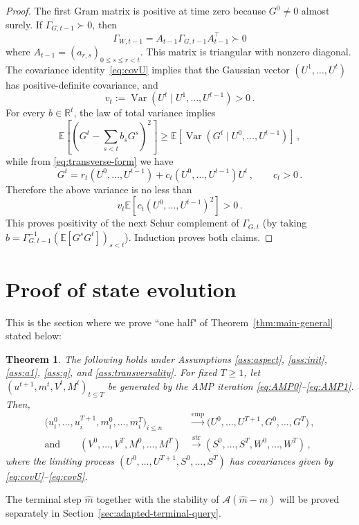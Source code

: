 \documentclass[11pt]{article}
\newtheorem{theorem}{Theorem}[section]
\theoremstyle{definition}
\theoremstyle{remark}
\numberwithin{equation}{section}
\numberwithin{theorem}{section}
\newcommand{\R}{\mathbb R}
\newcommand{\E}{\mathbb E}
\newcommand{\Var}{\operatorname{Var}}
\newcommand{\cA}{\mathcal A}
\begin{document}
\begin{proof}
The first Gram matrix is positive at time zero because $G^0\ne0$ almost
surely.  If $\Gamma_{G,t-1}\succ0$, then
\[
 \Gamma_{W,t-1}=A_{t-1}\Gamma_{G,t-1}A_{t-1}^{\top}\succ0
\]
where $A_{t-1}=(a_{r,s})_{0\le s\le r<t}$.  This matrix is triangular
with nonzero diagonal.  The covariance identity~\eqref{eq:covU} implies that  
the Gaussian vector $(U^1,\ldots,U^t)$ has positive-definite
covariance, and
\[
 v_t:=\Var(U^t\mid U^1,\ldots,U^{t-1})>0\,.
\]
For every $b\in\R^t$, the law of total variance implies
\[\E\left[\left(G^t-\sum_{s<t}b_sG^s\right)^2\right]
 \ge \E[\Var(G^t\mid U^0,\ldots,U^{t-1})]\,,\]
while from \eqref{eq:transverse-form} we have
\begin{equation*}
 G^t =r_t(U^0,\ldots,U^{t-1})
  +c_t(U^0,\ldots,U^{t-1})U^t\,,
 \qquad c_t>0\,.
\end{equation*}
Therefore the above variance is no less than
\[v_t\E[c_t(U^0,\ldots,U^{t-1})^2]>0\,.\]
This proves positivity of the next Schur complement of $\Gamma_{G,t}$ (by taking $b = \Gamma_{G,t-1}^{-1}(\E[G^sG^t])_{s<t}$).
Induction proves both claims.
\end{proof}



\section{Proof of state evolution}
\label{sec:proof-nondeg}
This is the section where we prove ``one half" of Theorem~\ref{thm:main-general} stated below: 
\begin{theorem}
\label{thm:direct_SE}
The following holds under Assumptions \ref{ass:aspect}, \ref{ass:init},
\ref{ass:a1}, \ref{ass:g}, and \ref{ass:transversality}.  For fixed $T \ge 1$, let $(u^{t+1},m^{t},V^{t},M^{t})_{t \le T}$ be generated by
the AMP iteration \eqref{eq:AMP0}--\eqref{eq:AMP1}.  Then, 
\begin{align}
  \bigl(u_i^0,\ldots,u_i^{T+1},m_i^0,\ldots,m_i^{T}\bigr)_{i\le n}
  &\xrightarrow{\mathrm{emp}}
  \bigl(U^0,\ldots,U^{T+1},G^0,\ldots,G^T\bigr)\,,\label{eq:vector-SE-main1}\\
\mbox{and}\qquad
  (V^0,\ldots,V^T,M^0,\ldots,M^T)
  &\xrightarrow{\mathrm{str}}
  (S^0,\ldots,S^T,W^0,\ldots,W^T)\,,\label{eq:matrix-SE-main1}
\end{align}
where the limiting process
$(U^0,\ldots,U^{T+1},S^0,\ldots,S^T)$ has covariances given by
\eqref{eq:covU}--\eqref{eq:covS}.
\end{theorem}
The terminal step $\widehat m$ together with the stability of $\cA(\widehat m - m)$ will be proved separately in Section~\ref{sec:adapted-terminal-query}.
\end{document}
